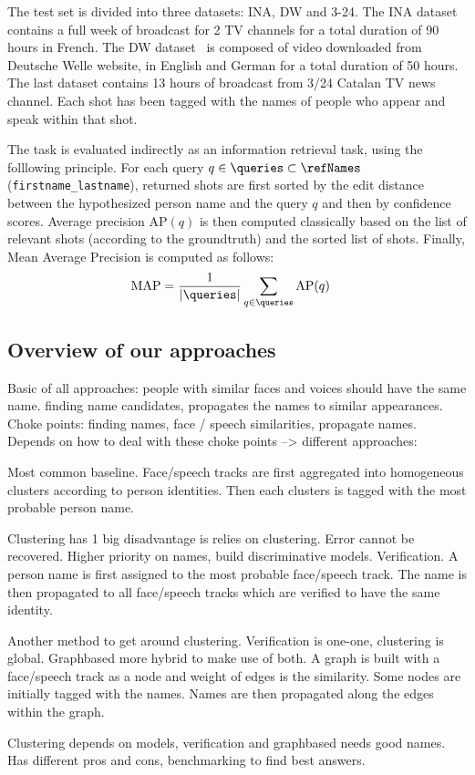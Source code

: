  The test set is divided into three datasets: INA, DW and 3-24. The INA dataset contains a full week of broadcast for 2 TV channels for a total duration of 90 hours in French. The DW dataset~\cite{EUMSSI} is composed of video downloaded from Deutsche Welle website, in English and German for a total duration of 50 hours. The last dataset contains 13 hours of broadcast from 3/24 Catalan TV news channel. Each shot has been tagged with the names of people who appear and speak within that shot.

 The task is evaluated indirectly as an information retrieval task, using the folllowing principle.
%
For each query $q \in \queries \subset \refNames$ (\texttt{first\-name\_lastname}), returned shots are first sorted by the edit distance between the hypothesized person name and the query $q$ and then by confidence scores.
Average precision $\text{AP}(q)$ is then computed classically based on the list of relevant shots (according to the groundtruth) and the sorted list of shots. Finally, Mean Average Precision is computed as follows:
\begin{align}
            \text{MAP} & = \frac{1}{|\queries|} \sum_{q \in \queries} \text{AP}(q) \nonumber
\end{align}

\subsection{Overview of our approaches}

Basic of all approaches: people with similar faces and voices should have the same name. finding name candidates, propagates the names to similar appearances. Choke points: finding names, face / speech similarities, propagate names. Depends on how to deal with these choke points --> different approaches:

Most common baseline. Face/speech tracks are first aggregated into homogeneous clusters according to person identities. Then each clusters is tagged with the most probable person name.

Clustering has 1 big disadvantage is relies on clustering. Error cannot be recovered. Higher priority on names, build discriminative models.
Verification.
A person name is first assigned to the most probable face/speech track. The name is then propagated to all face/speech tracks which are verified to have the same identity.

 Another method to get around clustering. Verification is one-one, clustering is global. Graphbased more hybrid to make use of both.
A graph is built with a face/speech track as a node and weight of edges is the similarity. Some nodes are initially tagged with the names. Names are then propagated along the edges within the graph.

Clustering depends on models, verification and graphbased needs good names. Has different pros and cons, benchmarking to find best answers.
\endinput
